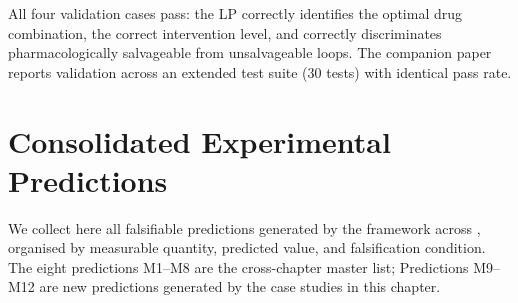 \begin{remark}
All four validation cases pass: the LP correctly identifies the optimal
drug combination, the correct intervention level, and correctly discriminates
pharmacologically salvageable from unsalvageable loops.  The companion paper
reports validation across an extended test suite (30 tests) with identical
pass rate.
\end{remark}

\section{Consolidated Experimental Predictions}
\label{sec:all-predictions}

We collect here all falsifiable predictions generated by the framework across
, organised by measurable quantity,
predicted value, and falsification condition.  The eight predictions M1--M8
are the cross-chapter master list; Predictions M9--M12 are new predictions
generated by the case studies in this chapter.


